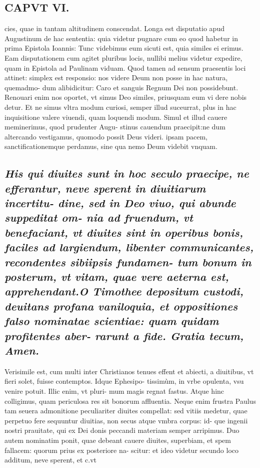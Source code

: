 \documentclass{article}
\begin{document}
\begin{pages}
\section*{CAPVT VI. }
\marginpar{[ p.83 ]}\pstart cies, quae in tantam altitudinem conscendat. Longa est disputatio apud Augustinum de hac sententia: quia videtur pugnare cum eo quod habetur in prima Epistola Ioannis: Tunc videbimus eum sicuti est, quia similes ei erimus. Eam disputationem cum agitet pluribus locis, nullibi melius videtur expedire, quam in Epistola ad Paulinam viduam. Quod tamen ad sensum praesentis loci attinet: simplex est responsio: nos videre Deum non posse in hac natura, quemadmo- dum alibidicitur: Caro et sanguis Regnum Dei non possidebunt. Renouari enim nos oportet, vt simus Deo similes, priusquam eum vi dere nobis detur. Et ne simus vltra modum curiosi, semper illud suceurrat, plus in hac inquisitione valere viuendi, quam loquendi modum. Simul et illud cauere meminerimus, quod prudenter Augu- stinus cauendum praecipit:ne dum altercando vestigamus, quomodo possit Deus videri. ipsam pacem, sanctificationemque perdamus, sine qua nemo Deum videbit vnquam.  \pend
{}
{}
\subsection*{\textit{His qui diuites sunt in hoc seculo praecipe, ne efferantur, neve sperent in diuitiarum incertitu- dine, sed in Deo viuo, qui abunde suppeditat om- nia ad fruendum, vt benefaciant, vt diuites sint in operibus bonis, faciles ad largiendum, libenter communicantes, recondentes sibiipsis fundamen- tum bonum in posterum, vt vitam, quae vere aeterna est, apprehendant.O Timothee depositum custodi, deuitans profana vaniloquia, et oppositiones falso nominatae scientiae: quam quidam profitentes aber- rarunt a fide. Gratia tecum, Amen. }}\pstart Verisimile est, cum multi inter Christianos tenues effent et abiecti, a diuitibus, vt fieri solet, fuisse contemptos. Idque Ephesipo- tissimùm, in vrbe opulenta, vsu venire potuit. Illic enim, vt pluri- mum magis regnat fastus. Atque hinc colligimus, quam periculosa res sit bonorum affluentia. Neque enim frustra Paulus tam seuera admonitione peculiariter diuites compellat: sed vitiis medetur, quae perpetuo fere sequuntur diuitias, non secus atque vmbra corpus: id- que ingenii nostri prauitate, qui ex Dei donis peccandi materiam semper arripimus. Duo autem nominatim ponit, quae debeant cauere diuites, superbiam, et spem fallacem: quorum prius ex posteriore na- scitur: et ideo videtur secundo loco additum, neve sperent, et c.vt  \pend

\end{pages}
\end{document}
